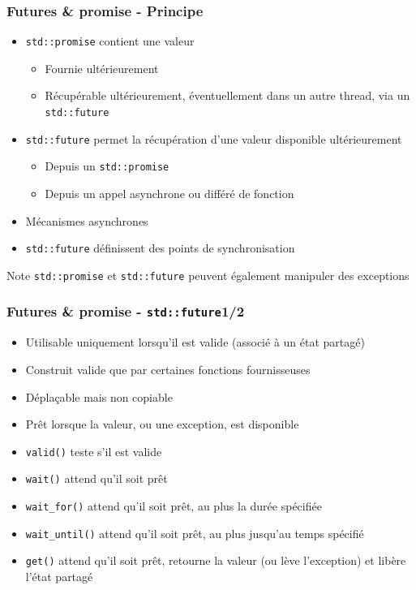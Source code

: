 \documentclass[C++.tex]{subfiles}
\begin{document}
\begin{frame}[fragile]
	\frametitle{Futures \& promise - Principe}
	\begin{itemize}
		\item \lstinline|std::promise| contient une valeur
		\begin{itemize}
			\item Fournie ultérieurement
			\item Récupérable ultérieurement, éventuellement dans un autre thread, via un \lstinline|std::future|
		\end{itemize}
		\item \lstinline|std::future| permet la récupération d'une valeur disponible ultérieurement
		\begin{itemize}
			\item Depuis un \lstinline|std::promise|
			\item Depuis un appel asynchrone ou différé de \og fonction\fg{}
		\end{itemize}
		\item Mécanismes asynchrones
		\item \lstinline|std::future| définissent des points de synchronisation
	\end{itemize}

	\begin{block}{Note}
		\lstinline|std::promise| et \lstinline|std::future| peuvent également manipuler des exceptions
	\end{block}
\end{frame}

\begin{frame}[fragile]
	\frametitle{Futures \& promise - \lstinline|std::future|\titlehfill{}1/2}
	\begin{itemize}
		\item Utilisable uniquement lorsqu'il est valide (associé à un état partagé)
		\item Construit valide que par certaines fonctions \og fournisseuses\fg{}
		\item Déplaçable mais non copiable
		\item Prêt lorsque la valeur, ou une exception, est disponible
		\item \lstinline|valid()| teste s'il est valide
		\item \lstinline|wait()| attend qu'il soit prêt
		\item \lstinline|wait_for()| attend qu'il soit prêt, au plus la durée spécifiée
		\item \lstinline|wait_until()| attend qu'il soit prêt, au plus jusqu'au temps spécifié
		\item \lstinline|get()| attend qu'il soit prêt, retourne la valeur (ou lève l'exception) et libère l'état partagé
	\end{itemize}
\end{frame}
\end{document}
